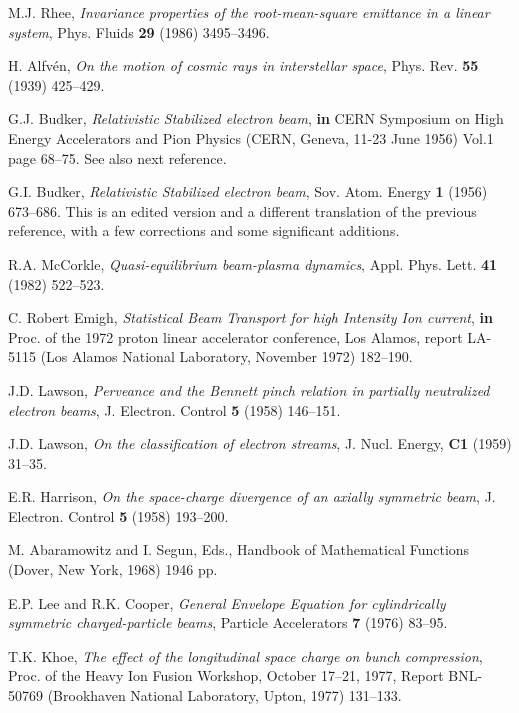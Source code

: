 \documentclass [12pt,a4paper,     ]{report} %
\begin{document}
\begin{enumerate}
 M.J. Rhee, \emph{Invariance properties of the root-mean-square emittance in a linear system}, Phys. Fluids {\bf 29} (1986) 3495--3496.

 H. Alfv\'en, \emph{On the motion of cosmic rays in interstellar space}, Phys. Rev. {\bf 55} (1939) 425--429.

 G.J. Budker, \emph{Relativistic Stabilized electron beam}, {\bf in} CERN Symposium on High Energy Accelerators and Pion Physics (CERN, Geneva, 11-23 June 1956) Vol.1 page 68--75.  See also next reference.

 G.I. Budker, \emph{Relativistic Stabilized electron beam}, Sov. Atom. Energy {\bf 1} (1956) 673--686.  This is an edited version and a different translation of the previous reference, with a few corrections and some significant additions.

 R.A. McCorkle, \emph{Quasi-equilibrium beam-plasma dynamics}, Appl. Phys. Lett. {\bf 41} (1982) 522--523.

 C. Robert Emigh,  \emph{Statistical Beam Transport for high Intensity Ion current}, {\bf in} Proc. of the 1972 proton linear accelerator conference, Los Alamos, report LA-5115 (Los Alamos National Laboratory, November 1972) 182--190.

 J.D. Lawson, \emph{Perveance and the Bennett pinch relation in partially neutralized electron beams}, J. Electron. Control {\bf 5} (1958) 146--151.

 J.D. Lawson, \emph{On the classification of electron streams}, J. Nucl. Energy, {\bf C1} (1959) 31--35.    

 E.R. Harrison, \emph{On the space-charge divergence of an axially symmetric beam}, J. Electron. Control {\bf 5} (1958) 193--200.

 M. Abaramowitz and I. Segun, Eds., Handbook of Mathematical Functions (Dover, New York, 1968) 1946 pp.

 E.P. Lee and R.K. Cooper, \emph{General Envelope Equation for cylindrically symmetric charged-particle beams}, Particle Accelerators {\bf 7}  (1976) 83--95. %

 T.K. Khoe, \emph{The effect of the longitudinal space charge on bunch compression}, Proc. of the Heavy Ion Fusion Workshop, October 17--21, 1977, Report BNL-50769 (Brookhaven National Laboratory, Upton, 1977) 131--133.


\end{enumerate}
\end{document}
